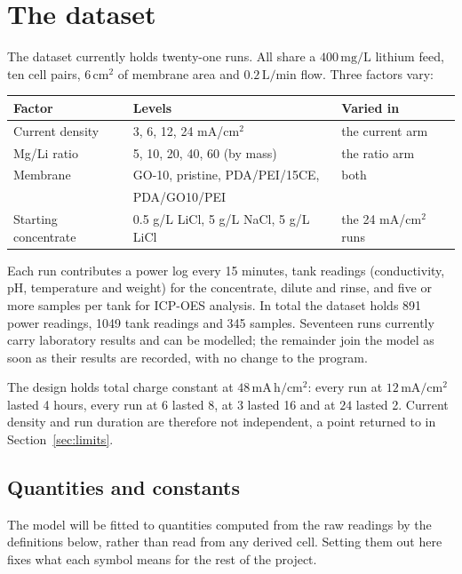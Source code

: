 \documentclass[11pt,a4paper]{article}
\newcommand{\unit}[1]{\,\mathrm{#1}}
\begin{document}
\section{The dataset}

The dataset currently holds twenty-one runs. All share a $400\unit{mg/L}$ lithium feed, ten
cell pairs, $6\unit{cm^2}$ of membrane area and $0.2\unit{L/min}$ flow. Three factors vary:

\begin{center}
\small
\begin{tabular}{@{}l l l@{}}
\toprule
Factor & Levels & Varied in \\
\midrule
Current density & 3, 6, 12, 24 mA/cm$^2$ & the current arm \\
Mg/Li ratio & 5, 10, 20, 40, 60 (by mass) & the ratio arm \\
Membrane & GO-10, pristine, PDA/PEI/15CE, & both \\
                     & PDA/GO10/PEI & \\
Starting concentrate & 0.5 g/L LiCl, 5 g/L NaCl, 5 g/L LiCl & the 24 mA/cm$^2$ runs \\
\bottomrule
\end{tabular}
\end{center}

Each run contributes a power log every 15 minutes, tank readings (conductivity, pH,
temperature and weight) for the concentrate, dilute and rinse, and five or more samples per
tank for ICP-OES analysis. In total the dataset holds 891 power readings, 1049 tank readings
and 345 samples. Seventeen runs currently carry laboratory results and can be modelled; the
remainder join the model as soon as their results are recorded, with no change to the program.

The design holds total charge constant at $48\unit{mA\,h/cm^2}$: every run at
$12\unit{mA/cm^2}$ lasted 4 hours, every run at $6$ lasted 8, at $3$ lasted 16 and at $24$
lasted 2. Current density and run duration are therefore not independent, a point returned to
in Section~\ref{sec:limits}.

\subsection*{Quantities and constants}

The model will be fitted to quantities computed from the raw readings by the definitions
below, rather than read from any derived cell. Setting them out here fixes what each symbol
means for the rest of the project.
\end{document}
